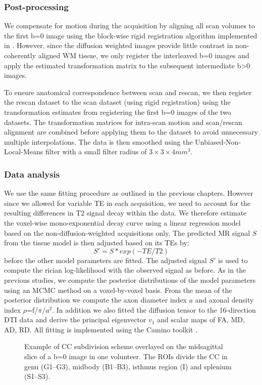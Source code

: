 \subsubsection*{Post-processing}
We compensate for motion during the acquisition by aligning all scan volumes to the first b=0 image using the block-wise rigid registration algorithm \citep{Ourselin:2001} implemented in \citep{Modat:2010}. However, since the diffusion weighted images provide little contrast in non-coherently aligned WM tissue, we only register the interleaved b=0 images and apply the estimated transformation matrix to the subsequent intermediate b>0 images.   

To ensure anatomical correspondence between scan and rescan, we then register the rescan dataset to the scan dataset (using rigid registration) using the transformation estimates from registering  the first b=0 images of the two datasets. The transformation matrices for intra-scan motion and scan/rescan alignment are combined before applying them to the dataset to avoid unnecessary multiple interpolations. The data is then smoothed using the Unbiased-Non-Local-Means filter \citep{Tristan-Vega:2012} with a small filter radius of $3\times3\times4 mm^3$.

\subsubsection*{Data analysis}
We use the same fitting procedure as outlined in the previous chapters. However since we allowed for variable TE in each acquisition, we need to account for the resulting differences in T2 signal decay within the data. We therefore estimate the voxel-wise mono-exponential decay curve using a linear regression model based on the non-diffusion-weighted acquisitions only. The predicted MR signal $S$ from the tissue model is then adjusted based on its \glspl{TE} by:
\begin{equation}
	S' = S * exp(-TE/T2)
\end{equation}
before the other model parameters are fitted. The adjusted signal $S'$ is used to compute the rician log-likelihood with the observed signal as before. As in the previous studies, we compute the posterior distributions of the model parameters using an MCMC method on a voxel-by-voxel basis. From the mean of the posterior distribution we compute the axon diameter index $a$ and axonal density index $\rho$=f/$\pi/a^2$. In addition we also fitted the diffusion tensor to the 16-direction DTI data and derive the principal eigenvector $v_1$ and scalar maps of FA, MD, AD, RD. All fitting is implemented using the Camino toolkit \citep{Cook:2006}.
\begin{figure}[ht]
	\centering
	\caption{Example of CC subdivision scheme overlayed on the midsagittal slice of a b=0 image in one volunteer. The ROIs divide the CC in genu (G1--G3), midbody (B1--B3), isthmus region (I) and splenium (S1--S3).}
	\label{fig:chap9 CC ROIs}
\end{figure}

